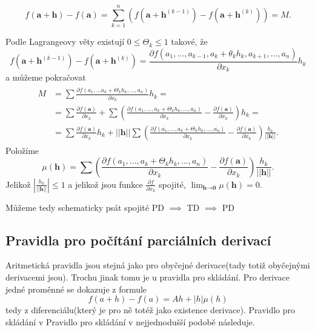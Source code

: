 \documentclass[../main.tex]{subfiles}
\begin{document}
\[f(\textbf{a}+\textbf{h}) - f(\textbf{a}) = \sum^n_{k=1}(f(\textbf{a}+\textbf{h}^{(k-1)})-f(\textbf{a}+\textbf{h}^{(k)})) = M.\]

\noindent
\hspace{1.2mm}
Podle Lagrangeovy věty existují $0 \leq \Theta_k \leq 1$ takové, že
\[f(\textbf{a}+\textbf{h}^{(k-1)})-f(\textbf{a}+\textbf{h}^{(k)}) = \frac{\partial f(a_1,...,a_{k-1},a_k+ \theta_kh_k,a_{k+1},...,a_n)}{\partial x_k}h_k\]
a můžeme pokračovat
\begin{align*} 
\begin{split}
M & = \sum\frac{\partial f(a_1,...a_k+\Theta_kh_k,...,a_n)}{\partial x_k}h_k = \\
 & = \sum \frac{\partial f(\textbf{a})}{\partial x_k} + \sum \left( \frac{\partial f(a_1,...,a_k+\Theta_kh_k,...,a_n)}{\partial x_k}
 - \frac{\partial f(\textbf{a})}{\partial x_k} \right)h_k = \\
 & = \sum \frac{\partial f(\textbf{a})}{\partial x_k}h_k + ||\textbf{h}||\sum\left(\frac{\partial f(a_1,...,a_k+\Theta_kh_k,...,a_n)}
 {\partial x_k}- \frac{\partial f(\textbf{a})}{\partial x_k}\right)\frac{h_k}{||\textbf{h}||}.
\end{split}
\end{align*}
Položíme
\[\mu (\textbf{h}) = \sum\left(\frac{\partial f(a_1,...,a_k+\Theta_kh_k,...,a_n)}{\partial x_k} -
    \frac{\partial f(\textbf{a})}{\partial x_k} \right)\frac{h_k}{||\textbf{h}||}.\]
    Jelikož $\left|\frac{h_k}{||\textbf{h}||}\right| \leq 1$ a jelikož jsou funkce $\frac{\partial f}{\partial x_k}$ spojité,
    $\lim_{\textbf{h}\rightarrow \textbf{0}} \mu (\textbf{h}) = 0$.
    \begin{center}
    \LARGE 
    Můžeme tedy schematicky psát
    \LARGE 
    spojité PD $\implies$ TD $\implies$ PD
    \end{center}
\noindent

\subsection{Pravidla pro počítání parciálních derivací}
\hspace{1.2mm}
\noindent
Aritmetická pravidla jsou stejná jako pro obyčejné derivace(tady totiž obyčejnými derivacemi jsou).
Trochu jinak tomu je u pravidla pro skládání. Pro derivace jedné proměnné se dokazuje z formule
\[ f(a+h) - f(a) = Ah + |h|\mu (h) \]
tedy z diferenciálu(který je pro ně totéž jako existence derivace). Pravidlo pro skládání v
Pravidlo pro skládání v nejjednodušší podobě následuje.
\end{document}
